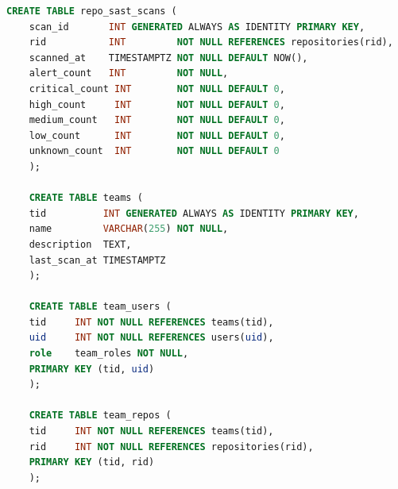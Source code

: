 \begin{lstlisting}[language=SQL, basicstyle=\ttfamily\small, breaklines=true, frame=single, showstringspaces=false, commentstyle=\color{green!50!black}]
	CREATE TABLE repo_sast_scans (
	scan_id       INT GENERATED ALWAYS AS IDENTITY PRIMARY KEY,
	rid           INT         NOT NULL REFERENCES repositories(rid),
	scanned_at    TIMESTAMPTZ NOT NULL DEFAULT NOW(),
	alert_count   INT         NOT NULL,
	critical_count INT        NOT NULL DEFAULT 0,
	high_count     INT        NOT NULL DEFAULT 0,
	medium_count   INT        NOT NULL DEFAULT 0,
	low_count      INT        NOT NULL DEFAULT 0,
	unknown_count  INT        NOT NULL DEFAULT 0
	);
	
	CREATE TABLE teams (
	tid          INT GENERATED ALWAYS AS IDENTITY PRIMARY KEY,
	name         VARCHAR(255) NOT NULL,
	description  TEXT,
	last_scan_at TIMESTAMPTZ
	);
	
	CREATE TABLE team_users (
	tid     INT NOT NULL REFERENCES teams(tid),
	uid     INT NOT NULL REFERENCES users(uid),
	role    team_roles NOT NULL,
	PRIMARY KEY (tid, uid)
	);
	
	CREATE TABLE team_repos (
	tid     INT NOT NULL REFERENCES teams(tid),
	rid     INT NOT NULL REFERENCES repositories(rid),
	PRIMARY KEY (tid, rid)
	);
\end{lstlisting}